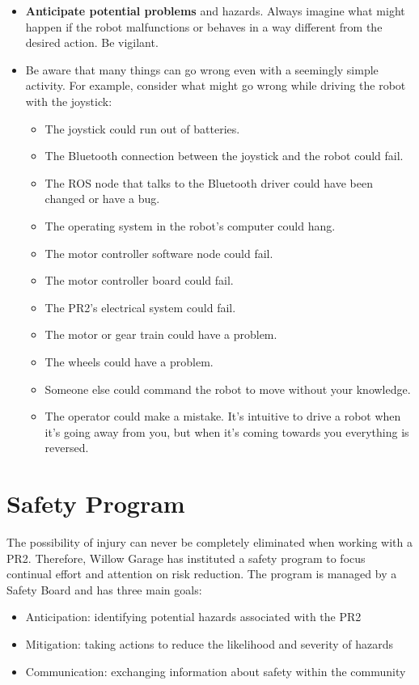 \begin{itemize}
\item {\bf Anticipate potential problems} and hazards.  Always imagine what might happen if the robot malfunctions or behaves in a way different from the desired action.  Be vigilant.
\item Be aware that many things can go wrong even with a seemingly simple activity. For example, consider what might go wrong while driving the robot with the joystick:
\begin{itemize}
\item The joystick could run out of batteries.
\item The Bluetooth connection between the joystick and the robot could fail.
\item The ROS node that talks to the Bluetooth driver could have been changed or have a bug.
\item The operating system in the robot's computer could hang.
\item The motor controller software node could fail.
\item The motor controller board could fail.
\item The PR2's electrical system could fail.
\item The motor or gear train could have a problem.
\item The wheels could have a problem.
\item Someone else could command the robot to move without your knowledge.
\item The operator could make a mistake. It's intuitive to drive a robot when it's going away from you, but when it's coming towards you everything is reversed.
\end{itemize}
\end{itemize}

\section{Safety Program}

The possibility of injury can never be completely eliminated when working with a PR2. Therefore, Willow Garage has instituted a safety program to focus continual effort and attention on risk reduction. The program is managed by a Safety Board and has three main goals:

\begin{itemize}
\item Anticipation: identifying potential hazards associated with the PR2
\item Mitigation: taking actions to reduce the likelihood and severity of hazards
\item Communication: exchanging information about safety within the community
\end{itemize}

